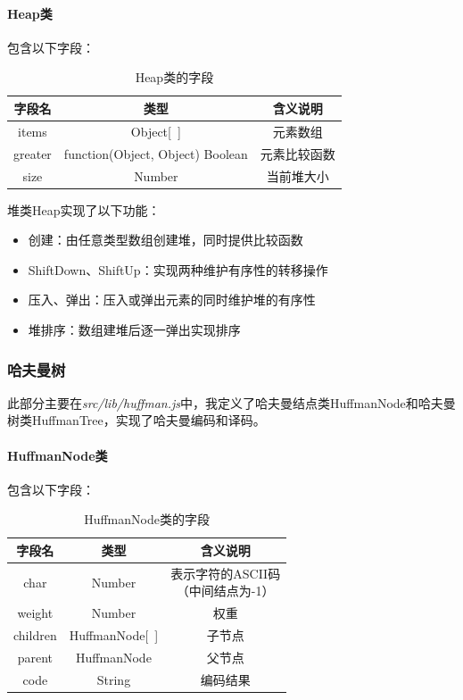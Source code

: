 \documentclass[scheme = chinese]{ctexart}
\begin{document}
\paragraph{Heap类} 包含以下字段：
\begin{table}[H]
    \centering
    \caption{Heap类的字段}
    \begin{tabular}{ccc}
        \toprule
        字段名 & 类型 & 含义说明 \\
        \midrule
        items & Object[~] & 元素数组 \\
        greater & function(Object, Object) Boolean & 元素比较函数 \\
        size & Number & 当前堆大小 \\
        \bottomrule
    \end{tabular}
\end{table}

堆类Heap实现了以下功能：
\begin{itemize}
    \item 创建：由任意类型数组创建堆，同时提供比较函数
    \item ShiftDown、ShiftUp：实现两种维护有序性的转移操作
    \item 压入、弹出：压入或弹出元素的同时维护堆的有序性
    \item 堆排序：数组建堆后逐一弹出实现排序
\end{itemize}

\subsubsection{哈夫曼树}
此部分主要在\emph{src/lib/huffman.js}中，我定义了哈夫曼结点类HuffmanNode和哈夫曼树类HuffmanTree，实现了哈夫曼编码和译码。

\paragraph{HuffmanNode类} 包含以下字段：
\begin{table}[H]
    \centering
    \caption{HuffmanNode类的字段}
    \begin{tabular}{ccc}
        \toprule
        字段名 & 类型 & 含义说明 \\
        \midrule
        char & Number & \makecell[ct]{
        表示字符的ASCII码 \\
        {\small（中间结点为-1）} \\
        } \\
        weight & Number & 权重 \\
        children & HuffmanNode[~] & 子节点 \\
        parent & HuffmanNode & 父节点 \\
        code & String & 编码结果 \\
        \bottomrule
    \end{tabular}
\end{table}
\end{document}
